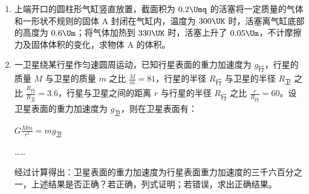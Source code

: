 \documentclass[\gkver]{gaokaozhenti}
\begin{document}
\begin{enumerate}
{

如左图，边长为 $1\Um$，所以对角线长为 $\sqrt{2}\Um$；

如右图，$dc=\frac{\sqrt{2}}{2}\Um$，$cO=dc\tan45^{\circ}=\frac{\sqrt{2}}{2}\Um\approx0.71\Um$。
}

\item
上端开口的圆柱形气缸竖直放置，截面积为 $0.2\Umq$ 的活塞将一定质量的气体和一形状不规则的固体 A 封闭在气缸内，温度为 $300\UK$ 时，活塞离气缸底部的高度为 $0.6\Um$；将气体加热到 $330\UK$ 时，活塞上升了 $0.05\Um$，不计摩擦力及固体体积的变化，求物体 A 的体积。

\onepicture[align=right, h=2.96cm]{}



\item
一卫星绕某行星作匀速圆周运动，已知行星表面的重力加速度为 $g_{\text{行}}$，行星的质量 $M$ 与卫星的质量 $m$ 之比 $\frac{M}{m}=81$，行星的半径 $R_{\text{行}}$ 与卫星的半径 $R_{\text{卫}}$ 之比 $\frac{R_{\text{行}}}{R_{\text{卫}}}=3.6$，行星与卫星之间的距离 $r$ 与行星的半径 $R_{\text{行}}$ 之比 $\frac{r}{R_{\text{行}}}=60$。设卫星表面的重力加速度为 $g_{\text{卫}}$，则在卫星表面有：

$G\frac{Mm}{r^{2}}=mg_{\text{卫}}$

……

经过计算得出：卫星表面的重力加速度为行星表面重力加速度的三千六百分之一，上述结果是否正确？若正确，列式证明；若错误，求出正确结果。



\end{enumerate}
\end{document}
